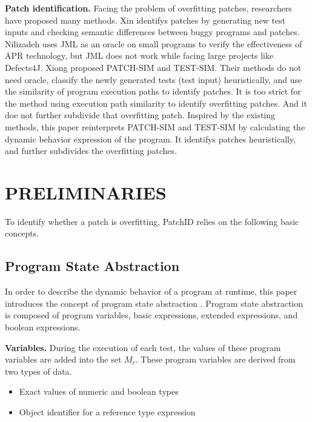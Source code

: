 \documentclass[sn-basic]{sn-jnl}
\theoremstyle{thmstyleone}
\theoremstyle{thmstyletwo}
\theoremstyle{thmstylethree}
\begin{document}
\textbf{Patch identification.} Facing the problem of overfitting patches, researchers have proposed many methods. Xin\citeyearpar{bib5} identifys patches by generating new test inputs and checking semantic differences between buggy programs and patches. Nilizadeh\citeyearpar{bib7} uses JML as an oracle on small programs to verify the effectiveness of APR technology, but JML does not work while facing large projects like Defects4J. Xiong\citeyearpar{bib8} proposed PATCH-SIM and TEST-SIM. Their methods do not need oracle, classify the newly generated tests (test input) heuristically, and use the similarity of program execution paths to identify patches. It is too strict for the method using execution path similarity to identify overfitting patches. And it doe not further subdivide that overfitting patch. Inspired by the existing methods, this paper reinterprets PATCH-SIM and TEST-SIM by calculating the dynamic behavior expression of the program. It identifys patches heuristically, and further subdivides the overfitting patches.


\section{PRELIMINARIES}\label{sec3}
To identify whether a patch is overfitting, PatchID relies on the following basic concepts.
\subsection{Program State Abstraction}
In order to describe the dynamic behavior of a program at runtime, this paper introduces the concept of program state abstraction \citep{bib47,bib48}. Program state abstraction is composed of program variables, basic expressions, extended expressions, and boolean expressions.

\textbf{Variables.} During the execution of each test, the values of these program variables are added into the set $ M_{\ell}$. These program variables are derived from two types of data.
\begin{itemize}
  \item Exact values of numeric and boolean types
  \item Object identifier for a reference type expression
\end{itemize}
\end{document}
